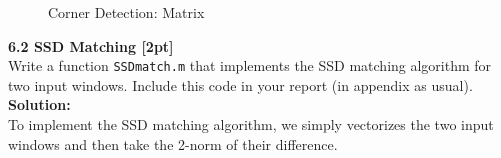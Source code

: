 \documentclass{assignment}
\begin{document}
\begin{problemlist}
\begin{figure}[!ht]
\centering
{}
\caption{Corner Detection: Matrix}
\end{figure}

\newpage
\textbf{6.2 SSD Matching [2pt]}\\
Write a function \texttt{SSDmatch.m} that implements the SSD matching algorithm for two input windows. Include this code in your report (in appendix as usual).\\
\textbf{Solution:}\\
To implement the SSD matching algorithm, we simply vectorizes the two input windows and then take the 2-norm of their difference.\\


\end{problemlist}
\end{document}
